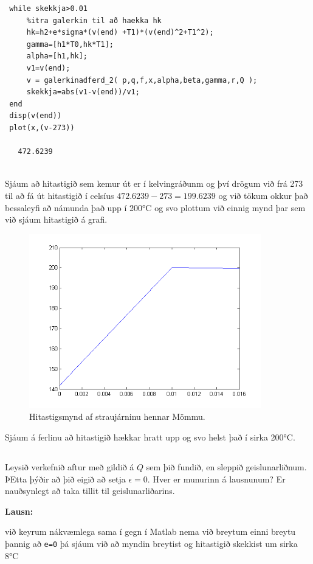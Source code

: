\documentclass[11pt,a4paper,titlepage]{article}
\begin{document}
 \begin{verbatim}
 while skekkja>0.01
     %itra galerkin til að haekka hk
     hk=h2+e*sigma*(v(end) +T1)*(v(end)^2+T1^2);
     gamma=[h1*T0,hk*T1];
     alpha=[h1,hk];
     v1=v(end);
     v = galerkinadferd_2( p,q,f,x,alpha,beta,gamma,r,Q );
     skekkja=abs(v1-v(end))/v1;
 end
 disp(v(end))
 plot(x,(v-273))
 
   472.6239
 
 \end{verbatim}
 Sjáum að hitastigið sem kemur út er í kelvingráðunm og því drögum við frá 273 til að fá út hitastigið í celsíus $472.6239-273=199.6239$ og við tökum okkur það bessaleyfi að námunda það upp í 200°C og svo plottum við einnig mynd þar sem við sjáum hitastigið á grafi. 
 \begin{figure}[h!]
      \centering
      \includegraphics[width=0.9\textwidth]{2_2_e_0_2.png}
      \caption{Hitastigsmynd af straujárninu hennar Mömmu.}
      \label{fig:awesome_image3}
  \end{figure}
  
  Sjáum á ferlinu að hitastigið hækkar hratt upp og svo helst það í sirka 200°C.
\subsection{}
Leysið verkefnið aftur með gildið á $Q$ sem þið fundið, en sleppið geislunarliðnum.  ÞEtta þýðir að þið eigið að setja $\epsilon = 0$. Hver er munurinn á lausnunum? Er nauðsynlegt að taka tillit til geislunarliðarins.  

\textbf{Lausn:}

við keyrum  nákvæmlega sama í gegn í Matlab nema við breytum einni breytu þannig að \verb|e=0| þá sjáum við að myndin breytist og hitastigið skekkist um sirka 8°C
\end{document}
